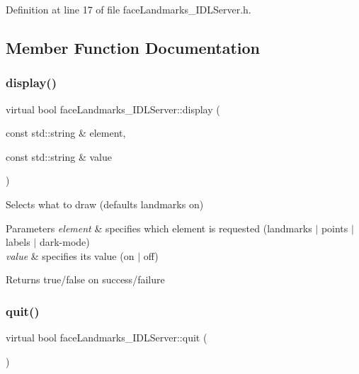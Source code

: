 Definition at line 17 of file face\+Landmarks\+\_\+\+I\+D\+L\+Server.\+h.



\subsection{Member Function Documentation}
\mbox{\label{classfaceLandmarks__IDLServer_a934f57ae7521327fe9e3dcc15aa4324a}} 
\subsubsection{\texorpdfstring{display()}{display()}}
{\footnotesize\ttfamily virtual bool face\+Landmarks\+\_\+\+I\+D\+L\+Server\+::display (\begin{DoxyParamCaption}\item[{const std\+::string \&}]{element,  }\item[{const std\+::string \&}]{value }\end{DoxyParamCaption})\hspace{0.3cm}{\ttfamily [virtual]}}


\begin{DoxyItemize}
\item Selects what to draw (defaults landmarks on)
\item 
\begin{DoxyParams}{Parameters}
{\em element} & specifies which element is requested (landmarks $\vert$ points $\vert$ labels $\vert$ dark-\/mode) \\
\hline
{\em value} & specifies its value (on $\vert$ off)\\
\hline
\end{DoxyParams}

\item \begin{DoxyReturn}{Returns}
true/false on success/failure 
\end{DoxyReturn}

\end{DoxyItemize}\mbox{\label{classfaceLandmarks__IDLServer_a545407b4071a1a8a3392881194dd1a56}} 
\subsubsection{\texorpdfstring{quit()}{quit()}}
{\footnotesize\ttfamily virtual bool face\+Landmarks\+\_\+\+I\+D\+L\+Server\+::quit (\begin{DoxyParamCaption}{ }\end{DoxyParamCaption})\hspace{0.3cm}{\ttfamily [virtual]}}



